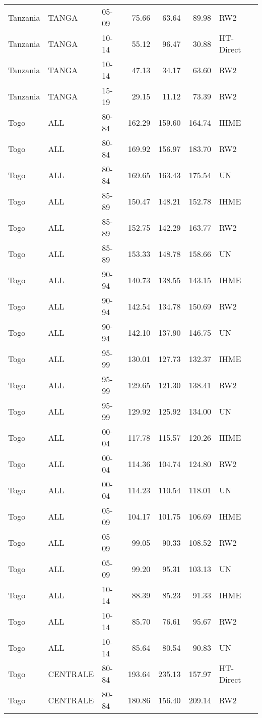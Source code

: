 \begin{longtable}{lllrrrl}
  Tanzania & TANGA & 05-09 & 75.66 & 63.64 & 89.98 & RW2 \\ 
  Tanzania & TANGA & 10-14 & 55.12 & 96.47 & 30.88 & HT-Direct \\ 
  Tanzania & TANGA & 10-14 & 47.13 & 34.17 & 63.60 & RW2 \\ 
  Tanzania & TANGA & 15-19 & 29.15 & 11.12 & 73.39 & RW2 \\ 
  Togo & ALL & 80-84 & 162.29 & 159.60 & 164.74 & IHME \\ 
  Togo & ALL & 80-84 & 169.92 & 156.97 & 183.70 & RW2 \\ 
  Togo & ALL & 80-84 & 169.65 & 163.43 & 175.54 & UN \\ 
  Togo & ALL & 85-89 & 150.47 & 148.21 & 152.78 & IHME \\ 
  Togo & ALL & 85-89 & 152.75 & 142.29 & 163.77 & RW2 \\ 
  Togo & ALL & 85-89 & 153.33 & 148.78 & 158.66 & UN \\ 
  Togo & ALL & 90-94 & 140.73 & 138.55 & 143.15 & IHME \\ 
  Togo & ALL & 90-94 & 142.54 & 134.78 & 150.69 & RW2 \\ 
  Togo & ALL & 90-94 & 142.10 & 137.90 & 146.75 & UN \\ 
  Togo & ALL & 95-99 & 130.01 & 127.73 & 132.37 & IHME \\ 
  Togo & ALL & 95-99 & 129.65 & 121.30 & 138.41 & RW2 \\ 
  Togo & ALL & 95-99 & 129.92 & 125.92 & 134.00 & UN \\ 
  Togo & ALL & 00-04 & 117.78 & 115.57 & 120.26 & IHME \\ 
  Togo & ALL & 00-04 & 114.36 & 104.74 & 124.80 & RW2 \\ 
  Togo & ALL & 00-04 & 114.23 & 110.54 & 118.01 & UN \\ 
  Togo & ALL & 05-09 & 104.17 & 101.75 & 106.69 & IHME \\ 
  Togo & ALL & 05-09 & 99.05 & 90.33 & 108.52 & RW2 \\ 
  Togo & ALL & 05-09 & 99.20 & 95.31 & 103.13 & UN \\ 
  Togo & ALL & 10-14 & 88.39 & 85.23 & 91.33 & IHME \\ 
  Togo & ALL & 10-14 & 85.70 & 76.61 & 95.67 & RW2 \\ 
  Togo & ALL & 10-14 & 85.64 & 80.54 & 90.83 & UN \\ 
  Togo & CENTRALE & 80-84 & 193.64 & 235.13 & 157.97 & HT-Direct \\ 
  Togo & CENTRALE & 80-84 & 180.86 & 156.40 & 209.14 & RW2 \\ 

\end{longtable}
